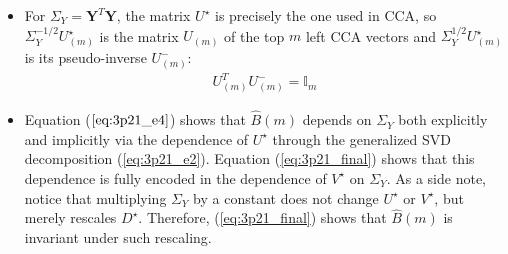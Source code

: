 \begin{itemize}
\item For $\Sigma_Y = \mathbf{Y}^T \mathbf{Y}$, the matrix $U ^{\star}$ is precisely the one used in CCA, so $\Sigma_Y^{-1/2} U ^{\star}_{(m)}$ is the matrix $U_{(m)}$ of the top $m$ left CCA vectors and $\Sigma_Y^{1/2} U ^{\star}_{(m)}$ is its pseudo-inverse $U_{(m)} ^{-}$:
\begin{eqnarray*}
U_{(m)} ^{T} U_{(m)} ^{-} = \mathbb{I}_m
\end{eqnarray*}
\item Equation ($\ref{eq:3p21_e4}$) shows that $\hat{B}(m)$ depends on $\Sigma_Y$ both explicitly and implicitly via the dependence of $U ^{\star}$ through the generalized SVD decomposition (\ref{eq:3p21_e2}). Equation (\ref{eq:3p21_final}) shows that this dependence is fully encoded in the dependence of $V ^{\star}$ on $\Sigma_Y$. As a side note, notice that multiplying $\Sigma_Y$ by a constant does not change $U ^{\star}$ or $V ^{\star}$, but merely rescales $D ^{\star}$. Therefore, (\ref{eq:3p21_final}) shows that $\hat{B}(m)$ is invariant under such rescaling.


\end{itemize}
